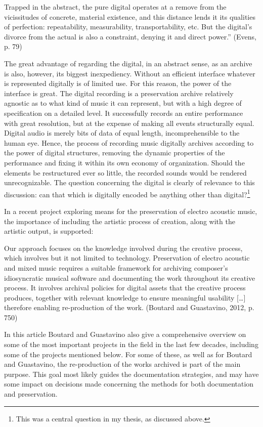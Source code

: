Trapped in the abstract, the pure digital operates at a remove from the
vicissitudes of concrete, material existence, and this distance lends it
its qualities of perfection: repeatability, measurability,
transportability, etc. But the digital's divorce from the actual is also
a constraint, denying it and direct power.'' (Evens, p. 79)

The great advantage of regarding the digital, in an abstract sense, as
an archive is also, however, its biggest inexpediency. Without an
efficient interface whatever is represented digitally is of limited use.
For this reason, the power of the interface is great. The digital
recording is a preservation archive relatively agnostic as to what kind
of music it can represent, but with a high degree of specification on a
detailed level. It successfully records an entire performance with great
resolution, but at the expense of making all events structurally equal.
Digital audio is merely bits of data of equal length, incomprehensible
to the human eye. Hence, the process of recording music digitally
archives according to the power of digital structures, removing the
dynamic properties of the performance and fixing it within its own
economy of organization. Should the elements be restructured ever so
little, the recorded sounds would be rendered unrecognizable. The
question concerning the digital is clearly of relevance to this
discussion: can that which is digitally encoded be anything other than
digital?\footnote{This was a central question in my thesis, as discussed
  above.}

In a recent project exploring means for the preservation of electro
acoustic music, the importance of including the artistic process of
creation, along with the artistic output, is supported:

Our approach focuses on the knowledge involved during the creative
process, which involves but it not limited to technology. Preservation
of electro acoustic and mixed music requires a suitable framework for
archiving composer's idiosyncratic musical software and documenting the
work throughout its creative process. It involves archival policies for
digital assets that the creative process produces, together with
relevant knowledge to ensure meaningful usability {[}\ldots{}{]}
therefore enabling re-production of the work. (Boutard and Guastavino,
2012, p. 750)

In this article Boutard and Guastavino also give a comprehensive
overview on some of the most important projects in the field in the last
few decades, including some of the projects mentioned below. For some of
these, as well as for Boutard and Guastavino, the re-production of the
works archived is part of the main purpose. This goal most likely guides
the documentation strategies, and may have some impact on decisions made
concerning the methods for both documentation and preservation.

